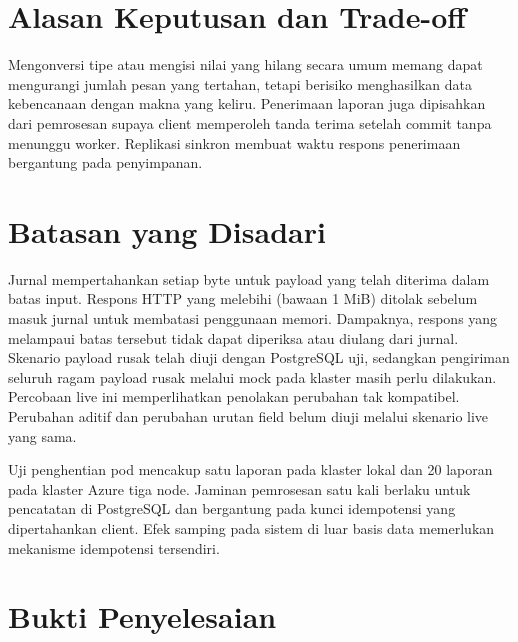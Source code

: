 \section{Alasan Keputusan dan Trade-off}

Mengonversi tipe atau mengisi nilai yang hilang secara umum memang dapat mengurangi jumlah pesan yang tertahan, tetapi berisiko menghasilkan data kebencanaan dengan makna yang keliru. Penerimaan laporan juga dipisahkan dari pemrosesan supaya client memperoleh tanda terima setelah commit tanpa menunggu worker. Replikasi sinkron membuat waktu respons penerimaan bergantung pada penyimpanan.

\section{Batasan yang Disadari}

Jurnal mempertahankan setiap byte untuk payload yang telah diterima dalam batas input. Respons HTTP yang melebihi  (bawaan 1 MiB) ditolak sebelum masuk jurnal untuk membatasi penggunaan memori. Dampaknya, respons yang melampaui batas tersebut tidak dapat diperiksa atau diulang dari jurnal. Skenario payload rusak telah diuji dengan PostgreSQL uji, sedangkan pengiriman seluruh ragam payload rusak melalui mock pada klaster masih perlu dilakukan. Percobaan live ini memperlihatkan penolakan perubahan tak kompatibel. Perubahan aditif dan perubahan urutan field belum diuji melalui skenario live yang sama.

Uji penghentian pod mencakup satu laporan pada klaster lokal dan 20 laporan pada klaster Azure tiga node. Jaminan pemrosesan satu kali berlaku untuk pencatatan di PostgreSQL dan bergantung pada kunci idempotensi yang dipertahankan client. Efek samping pada sistem di luar basis data memerlukan mekanisme idempotensi tersendiri.

\section{Bukti Penyelesaian}

